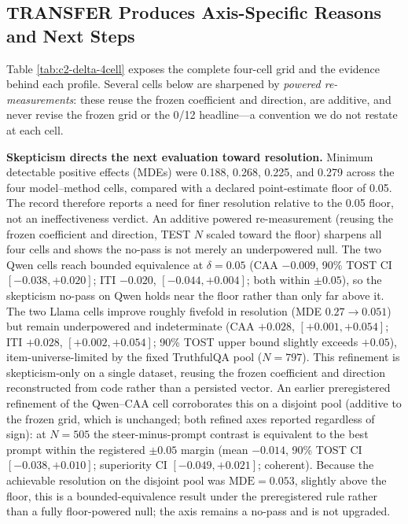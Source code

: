 \documentclass[manuscript,review,anonymous]{acmart}
\begin{document}
\subsection{TRANSFER Produces Axis-Specific Reasons and Next Steps}\label{transfer-produces-axis-specific-reasons-and-next-steps}



Table \ref{tab:c2-delta-4cell} exposes the complete four-cell grid and the evidence behind each profile. Several cells below are sharpened by \emph{powered re-measurements}: these reuse the frozen coefficient and direction, are additive, and never revise the frozen grid or the 0/12 headline---a convention we do not restate at each cell.

\textbf{Skepticism directs the next evaluation toward resolution.} Minimum detectable positive effects (MDEs) were 0.188, 0.268, 0.225, and 0.279 across the four model--method cells, compared with a declared point-estimate floor of 0.05. {}%
{}%
The record therefore reports a need for finer resolution relative to the 0.05 floor, not an ineffectiveness verdict.
An additive powered re-measurement (reusing the frozen coefficient and direction, TEST \(N\) scaled toward the floor) sharpens all four cells and shows the no-pass is not merely an underpowered null. The two Qwen cells reach bounded equivalence at \(\delta=0.05\) (CAA \(-0.009\), 90\% TOST CI \([-0.038,+0.020]\); ITI \(-0.020\), \([-0.044,+0.004]\); both within \(\pm0.05\)), so the skepticism no-pass on Qwen holds near the floor rather than only far above it. The two Llama cells improve roughly fivefold in resolution (MDE \(0.27\rightarrow0.051\)) but remain underpowered and indeterminate (CAA \(+0.028\), \([+0.001,+0.054]\); ITI \(+0.028\), \([+0.002,+0.054]\); 90\% TOST upper bound slightly exceeds \(+0.05\)), item-universe-limited by the fixed TruthfulQA pool (\(N=797\)). This refinement is skepticism-only on a single dataset, reusing the frozen coefficient and direction reconstructed from code rather than a persisted vector. {}%
An earlier preregistered refinement of the Qwen--CAA cell corroborates this on a disjoint pool (additive to the frozen grid, which is unchanged; both refined axes reported regardless of sign): at \(N=505\) the steer-minus-prompt contrast is equivalent to the best prompt within the registered \(\pm0.05\) margin (mean \(-0.014\), 90\% TOST CI \([-0.038,+0.010]\); superiority CI \([-0.049,+0.021]\); coherent). Because the achievable resolution on the disjoint pool was \(\text{MDE}=0.053\), slightly above the floor, this is a bounded-equivalence result under the preregistered rule rather than a fully floor-powered null; the axis remains a no-pass and is not upgraded. {}%
\end{document}
